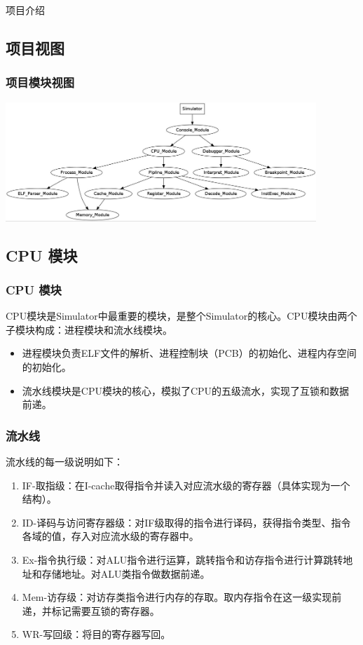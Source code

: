\documentclass[CJK]{beamer}
\begin{document}
\begin{CJK}{UTF8}{gbsn}
\begin{frame}
	\huge{项目介绍}
\end{frame}

\subsection{项目视图}
\begin{frame}
	\frametitle{项目模块视图}
	\includegraphics[height=4.5cm]{module_view.jpeg}
\end{frame}


\subsection{CPU 模块}
\begin{frame}[fragile]
	\frametitle{CPU 模块}
	CPU模块是Simulator中最重要的模块，是整个Simulator的核心。CPU模块由两个子模块构成：进程模块和流水线模块。
	\begin{itemize}
		\item 进程模块负责ELF文件的解析、进程控制块（PCB）的初始化、进程内存空间的初始化。
		\item 流水线模块是CPU模块的核心，模拟了CPU的五级流水，实现了互锁和数据前递。
	\end{itemize}
\end{frame}

\begin{frame}[fragile]
	\frametitle{流水线}
	流水线的每一级说明如下：
	\begin{enumerate}
		\item IF-取指级：在I-cache取得指令并读入对应流水级的寄存器（具体实现为一个结构）。
		\item ID-译码与访问寄存器级：对IF级取得的指令进行译码，获得指令类型、指令各域的值，存入对应流水级的寄存器中。
		\item Ex-指令执行级：对ALU指令进行运算，跳转指令和访存指令进行计算跳转地址和存储地址。对ALU类指令做数据前递。
		\item Mem-访存级：对访存类指令进行内存的存取。取内存指令在这一级实现前递，并标记需要互锁的寄存器。
		\item WR-写回级：将目的寄存器写回。
	\end{enumerate}
\end{frame}


\end{CJK}
\end{document}
